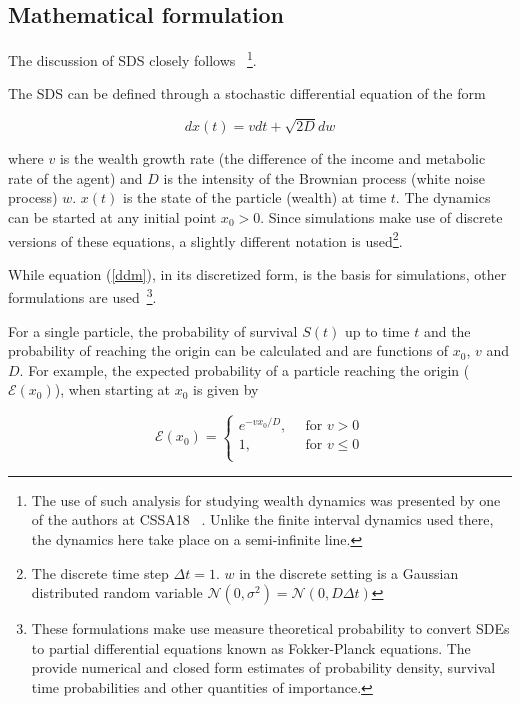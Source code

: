 \subsection{Mathematical formulation}
The discussion of SDS closely follows ~\cite{redner2001guide}\footnote{The use of such analysis for studying wealth dynamics was presented by one of the authors at CSSA18 ~\cite{rv}. Unlike the finite interval dynamics used there, the dynamics here take place on a semi-infinite line.}.

The SDS can be defined through a stochastic differential equation of the form 

\begin{equation}\label{ddm}
dx(t) = vdt + \sqrt{2D} dw
\end{equation}

\noindent where $v$ is the wealth growth rate (the difference of the income and metabolic rate of the agent) and $D$ is the intensity of the Brownian process (white noise process) $w$. $x(t)$ is the state of the particle (wealth) at time $t$. The dynamics can be started at any initial point $x_0 > 0$. Since simulations make use of discrete versions of these equations, a slightly different notation is used\footnote{The discrete time step $\Delta t=1$. $w$ in the discrete setting is a Gaussian distributed random variable $\mathcal{N}(0,\sigma^2) = \mathcal{N}(0,D\Delta t)$ }.

While equation (\ref{ddm}), in its discretized form, is the basis for simulations, other formulations are used~\cite{redner2001guide,rv}\footnote{These formulations make use measure theoretical probability to convert SDEs to partial differential equations known as Fokker-Planck equations.  The provide numerical and closed form estimates of probability density, survival time probabilities and other quantities of importance.}.

For a single particle, the probability of survival $S(t)$ up to time $t$ and the probability of reaching the origin can be calculated and are functions of $x_0$, $v$ and $D$. For example, the expected probability of a particle reaching the origin ($\mathcal{E}(x_0)$), when starting at $x_0$ is given by 

\begin{equation}\label{e}
\mathcal{E}(x_0) = \begin{cases}
e^{-v x_0/D} \text{, } & \text{ for } v > 0 \\
1 \text{, } & \text{ for } v \leq 0 \\
\end{cases}
\end{equation}  

